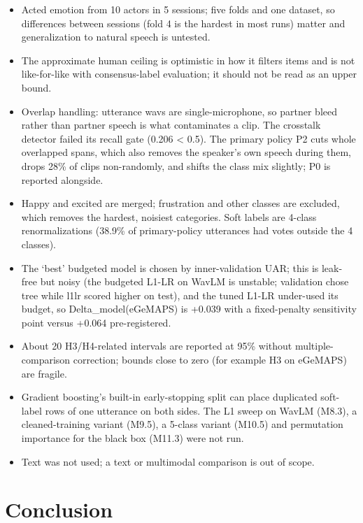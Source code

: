 \documentclass[11pt]{article}
\providecommand{\tightlist}{\setlength{\itemsep}{0pt}\setlength{\parskip}{0pt}}
\begin{document}
\begin{itemize}
\tightlist
\item
  Acted emotion from 10 actors in 5 sessions; five folds and one dataset, so differences between sessions (fold 4 is the hardest in most runs) matter and generalization to natural speech is untested.
\item
  The approximate human ceiling is optimistic in how it filters items and is not like-for-like with consensus-label evaluation; it should not be read as an upper bound.
\item
  Overlap handling: utterance wavs are single-microphone, so partner bleed rather than partner speech is what contaminates a clip. The crosstalk detector failed its recall gate (0.206 \textless{} 0.5). The primary policy P2 cuts whole overlapped spans, which also removes the speaker's own speech during them, drops 28\% of clips non-randomly, and shifts the class mix slightly; P0 is reported alongside.
\item
  Happy and excited are merged; frustration and other classes are excluded, which removes the hardest, noisiest categories. Soft labels are 4-class renormalizations (38.9\% of primary-policy utterances had votes outside the 4 classes).
\item
  The `best' budgeted model is chosen by inner-validation UAR; this is leak-free but noisy (the budgeted L1-LR on WavLM is unstable; validation chose tree while l1lr scored higher on test), and the tuned L1-LR under-used its budget, so Delta\_model(eGeMAPS) is +0.039 with a fixed-penalty sensitivity point versus +0.064 pre-registered.
\item
  About 20 H3/H4-related intervals are reported at 95\% without multiple-comparison correction; bounds close to zero (for example H3 on eGeMAPS) are fragile.
\item
  Gradient boosting's built-in early-stopping split can place duplicated soft-label rows of one utterance on both sides. The L1 sweep on WavLM (M8.3), a cleaned-training variant (M9.5), a 5-class variant (M10.5) and permutation importance for the black box (M11.3) were not run.
\item
  Text was not used; a text or multimodal comparison is out of scope.
\end{itemize}

\section{Conclusion}\label{conclusion}
\end{document}
